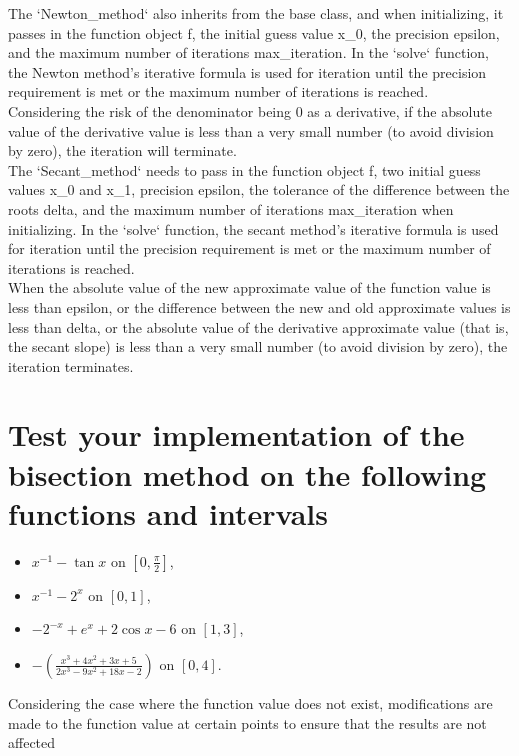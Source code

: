 \documentclass[a4paper]{article}
\begin{document}
The `Newton_method` also inherits from the base class, and when initializing, it passes in the function object f, the initial guess value x_0, the precision epsilon, and the maximum number of iterations max_iteration. In the `solve` function, the Newton method's iterative formula is used for iteration until the precision requirement is met or the maximum number of iterations is reached.\\
Considering the risk of the denominator being 0 as a derivative, if the absolute value of the derivative value is less than a very small number (to avoid division by zero), the iteration will terminate.\\
The `Secant_method` needs to pass in the function object f, two initial guess values x_0 and x_1, precision epsilon, the tolerance of the difference between the roots delta, and the maximum number of iterations max_iteration when initializing. In the `solve` function, the secant method's iterative formula is used for iteration until the precision requirement is met or the maximum number of iterations is reached.\\
When the absolute value of the new approximate value of the function value is less than epsilon, or the difference between the new and old approximate values is less than delta, or the absolute value of the derivative approximate value (that is, the secant slope) is less than a very small number (to avoid division by zero), the iteration terminates.\\



\section*{ Test your implementation of the bisection method on the
following functions and intervals}

\begin{itemize}
  \item $x^{-1} - \tan x$ on $\left[0, \frac{\pi}{2}\right]$,
  \item $x^{-1} - 2^x$ on $[0,1]$,
  \item $-2^{-x} + e^x + 2\cos x - 6$ on $[1,3]$,
  \item $-\left(\frac{x^{3} + 4 x^{2} + 3 x + 5}{2 x^{3} - 9 x^{2} + 18 x - 2}\right)$ on $[0,4]$.
\end{itemize}
Considering the case where the function value does not exist, modifications are made to the function value at certain points to ensure that the results are not affected\\
\begin{verbatim}

\end{verbatim}
\end{document}

